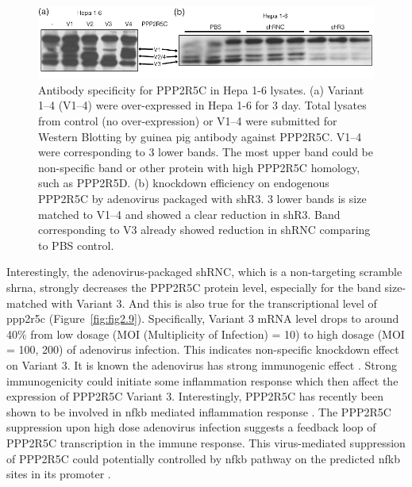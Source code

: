 \begin{figure}[htbp]
\centering
\includegraphics[width=1\textwidth]{figs/fig2-8 gp anti-v3 kd OE.pdf}
\caption[Specificity of GP antibody for PPP2R5C]{\footnotesize Antibody specificity for PPP2R5C in Hepa 1-6 lysates. (a) Variant 1--4 (V1--4) were over-expressed in Hepa 1-6 for 3 day. Total lysates from control (no over-expression) or V1--4 were submitted for Western Blotting by guinea pig antibody against PPP2R5C. V1--4 were corresponding to 3 lower bands. The most upper band could be non-specific band or other protein with high PPP2R5C homology, such as PPP2R5D. (b) knockdown efficiency on endogenous PPP2R5C by adenovirus packaged with shR3. 3 lower bands is size matched to V1--4 and showed a clear reduction in shR3. Band corresponding to V3 already showed reduction in shRNC comparing to PBS control.}
\label{fig:fig2.8}
\end{figure}

Interestingly, the adenovirus-packaged shRNC, which is a non-targeting scramble \gls{shrna}, strongly decreases the PPP2R5C protein level, especially for the band size-matched with Variant 3. And this is also true for the transcriptional level of \gls{ppp2r5c} (Figure~\ref{fig:fig2.9}). Specifically, Variant 3 mRNA level drops to around 40\% from low dosage (MOI (Multiplicity of Infection) = 10) to high dosage (MOI = 100, 200) of adenovirus infection. This indicates non-specific knockdown effect on Variant 3. It is known the adenovirus has strong immunogenic effect \cite{descamps_two_2009}. Strong immunogenicity could initiate some inflammation response which then affect the expression of PPP2R5C Variant 3. Interestingly, PPP2R5C has recently been shown to be involved in \gls{nfkb} mediated inflammation response \cite{breuer_protein_2014}. The PPP2R5C suppression upon high dose adenovirus infection suggests a feedback loop of PPP2R5C transcription in the immune response. This virus-mediated suppression of PPP2R5C could potentially controlled by \gls{nfkb} pathway on the predicted \gls{nfkb} sites in its promoter \cite{_sabiosciences_????}. 

